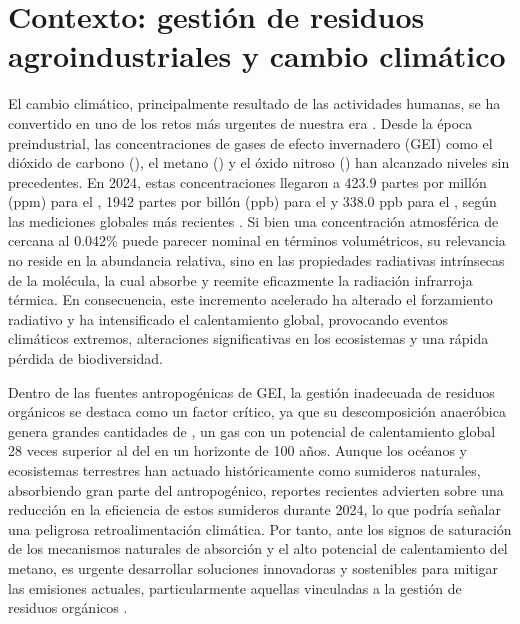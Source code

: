 \section{Contexto: gestión de residuos agroindustriales y cambio climático}

El cambio climático, principalmente resultado de las actividades humanas, se ha convertido en uno de los retos más urgentes de nuestra era \cite{allanSummaryPolicymakers2023}. Desde la época preindustrial, las concentraciones de gases de efecto invernadero (GEI) como el dióxido de carbono (), el metano () y el óxido nitroso () han alcanzado niveles sin precedentes. En 2024, estas concentraciones llegaron a 423.9 partes por millón (ppm) para el , 1942 partes por billón (ppb) para el  y 338.0 ppb para el , según las mediciones globales más recientes \cite{ak-bhdWEATHERCLIMATEWATER}. Si bien una concentración atmosférica de  cercana al 0.042\% puede parecer nominal en términos volumétricos, su relevancia no reside en la abundancia relativa, sino en las propiedades radiativas intrínsecas de la molécula, la cual absorbe y reemite eficazmente la radiación infrarroja térmica. En consecuencia, este incremento acelerado ha alterado el forzamiento radiativo y ha intensificado el calentamiento global, provocando eventos climáticos extremos, alteraciones significativas en los ecosistemas y una rápida pérdida de biodiversidad.

Dentro de las fuentes antropogénicas de GEI, la gestión inadecuada de residuos orgánicos se destaca como un factor crítico, ya que su descomposición anaeróbica genera grandes cantidades de , un gas con un potencial de calentamiento global 28 veces superior al del  en un horizonte de 100 años. Aunque los océanos y ecosistemas terrestres han actuado históricamente como sumideros naturales, absorbiendo gran parte del  antropogénico, reportes recientes advierten sobre una reducción en la eficiencia de estos sumideros durante 2024, lo que podría señalar una peligrosa retroalimentación climática. Por tanto, ante los signos de saturación de los mecanismos naturales de absorción y el alto potencial de calentamiento del metano, es urgente desarrollar soluciones innovadoras y sostenibles para mitigar las emisiones actuales, particularmente aquellas vinculadas a la gestión de residuos orgánicos \cite{oecdFoodLossWaste2025}.

